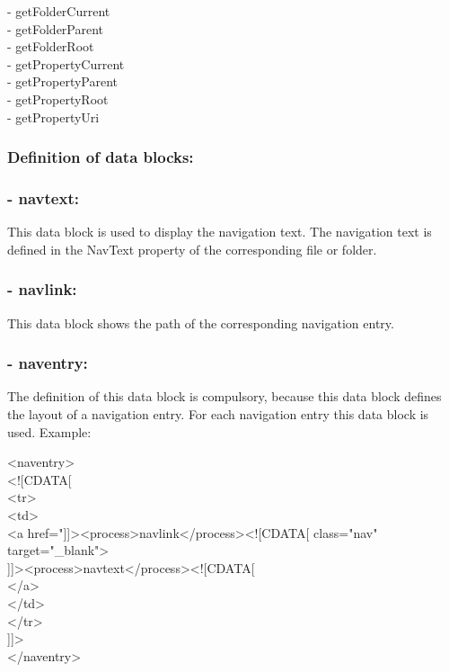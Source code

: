 - getFolderCurrent  \\
- getFolderParent  \\
- getFolderRoot  \\
- getPropertyCurrent  \\
- getPropertyParent  \\
- getPropertyRoot  \\
- getPropertyUri  \\
\subsubsection{Definition of data blocks:}
\subsubsection{- navtext:} 
  This data block is used to display the navigation text. 
The navigation text is defined in the {\name NavText} property 
of the corresponding file or folder. \\

\subsubsection{- navlink:} 

  This data block shows the path of the corresponding 
navigation entry.\\

\subsubsection{- naventry:} \index{}

  The definition of this data block is compulsory, because 
this data block defines the layout of a navigation entry. 
For each navigation entry this data block is used. Example: \\

  \begin{xml}
  <naventry> \\
  <![CDATA[ \\
  <tr> \\
  \xtaba <td> \\
  \xtabb   <a href="]]><process>navlink</process><![CDATA[ class="nav" target="\_blank"> \\
  \xtabc      ]]><process>navtext</process><![CDATA[ \\
  \xtabb   </a> \\
  \xtaba </td> \\
  </tr> \\
  ]]> \\
  </naventry> \\
  \end{xml}

